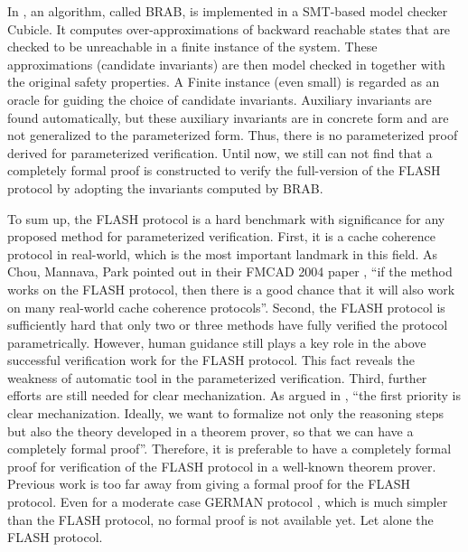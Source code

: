 \documentclass{llncs}
\newcommand{\bedt}[1]{{\color{black}#1}}
\begin{document}
\bedt{In \cite{cubeicBeyond}, an algorithm, called BRAB, is implemented in a SMT-based model checker Cubicle.  It} computes over-approximations of
backward reachable states that are checked to be unreachable in
a finite instance of the system. These approximations (candidate
invariants) are then model checked in together with the original
safety properties. A Finite instance (even small) is regarded as
an oracle for guiding the choice of candidate
invariants. Auxiliary invariants are found automatically, but these auxiliary invariants are in concrete form and are not generalized to the parameterized form. Thus, there is no  parameterized proof derived for parameterized verification. Until now, we still can not find that a completely formal proof is constructed to verify the full-version of the FLASH protocol by adopting the invariants computed by BRAB. %

To sum up,  the FLASH protocol is a hard  benchmark with significance for any proposed method for parameterized verification. First, it is a cache coherence protocol in real-world, which is  the most important landmark in this field.  As Chou, Mannava, Park pointed out in their FMCAD 2004 paper \cite{Chou2004}, ``if the method works on the FLASH protocol, then there is a good chance that it will also work on many real-world cache coherence protocols''. Second,
the FLASH protocol is  sufficiently hard that only two or three methods have  fully verified
the protocol parametrically. However, human guidance still plays a key role in the above successful verification work for the FLASH protocol. This fact reveals  the weakness of automatic tool in the parameterized verification.  Third, further  efforts are still needed for clear mechanization. As argued in \cite{Chou2004}, ``the first priority is clear mechanization. Ideally, we want to formalize not only the reasoning
steps  but also the theory developed in a theorem
prover, so that we can have a completely formal proof''. Therefore, it is preferable to  have a completely formal proof for verification of the  FLASH protocol in a well-known theorem prover. Previous work is too far away from giving a formal proof for the FLASH protocol. Even for a moderate case GERMAN protocol \cite{Arons2001}, which is much simpler than the FLASH protocol, no formal proof is not available yet. Let alone the FLASH protocol.
\end{document}
